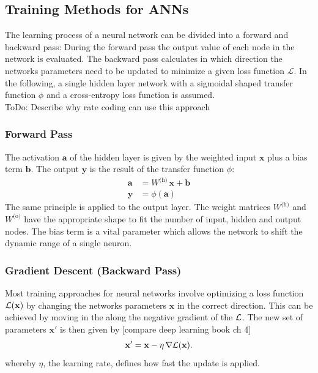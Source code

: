 \subsection{Training Methods for ANNs}
\label{trainingANN}

The learning process of a neural network can be divided into a forward and backward pass: During the forward pass the output value of each node in the network is evaluated. The backward pass calculates in which direction the networks parameters need to be updated to minimize a given loss function $\mathcal{L}$. In the following, a single hidden layer network with a sigmoidal shaped transfer function $\phi$ and a cross-entropy loss function is assumed.\\

ToDo: Describe why rate coding can use this approach

\subsubsection{Forward Pass}
The activation $\mathbf{a}$ of the hidden layer is given by the weighted input $\mathbf{x}$ plus a bias term $\mathbf{b}$. The output $\mathbf{y}$ is the result of the transfer function $\phi$:
\begin{align}
\mathbf{a} &= W^{\text{(h)}} \, \mathbf{x} + \mathbf{b} \\
\mathbf{y} &= \phi(\mathbf{a})
\end{align} 
The same principle is applied to the output layer. The weight matrices $W^{\text{(h)}}$ and $ W^{\text{(o)}}$ have the appropriate shape to fit the number of input, hidden and output nodes. The bias term is a vital parameter which allows the network to shift the dynamic range of a single neuron.

\subsubsection{Gradient Descent (Backward Pass)}

Most training approaches for neural networks involve optimizing a loss function $\mathcal{L}(\mathbf{x})$ by changing the networks parameters $\mathbf{x}$ in the correct direction. This can be achieved by moving in the along the negative gradient of the $\mathcal{L}$. The new set of parameters $\mathbf{x'}$ is then given by [compare deep learning book ch 4]
\begin{equation}
\mathbf{x'} = \mathbf{x} - \eta \, \nabla\mathcal{L}(\mathbf{x}).
\end{equation}
whereby $\eta$, the learning rate, defines how fast the update is applied.\\

